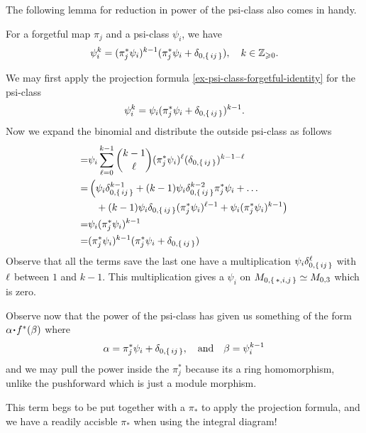 \documentclass[12pt]{memoir}
\begin{document}
The following lemma for reduction in power of the psi-class also comes in handy.

\begin{Lem}
For a forgetful map $\pi_j$ and a psi-class $\psi_i$, we have 
$$\psi_i^k=(\pi_j^\ast\psi_i)^{k-1}(\pi_j^\ast\psi_i+\delta_{0,\{\,ij\,\}}),\quad k\in\mathbb{Z}_{\geqslant 0}.$$
\end{Lem}

\begin{ptcbp}
    We may first apply the projection formula \ref{ex-psi-class-forgetful-identity} for the psi-class
    $$\psi_i^k=\psi_i(\pi_j^\ast\psi_i+\delta_{0,\{\,ij\,\}})^{k-1}.$$
    Now we expand the binomial and distribute the outside psi-class as follows 
    \begin{align*}
        =&\psi_i\sum_{\ell=0}^{k-1}\binom{k-1}{\ell}(\pi_j^\ast\psi_i)^\ell(\delta_{0,\{\,ij\,\}})^{k-1-\ell}\\
        =&\left(\psi_i\delta_{0,\{\,ij\,\}}^{k-1}+(k-1){\psi_i}\delta_{0,\{\,ij\,\}}^{k-2}\pi_j^\ast\psi_i+\dots\right.\\
        &\left.\phantom{\left(\right.}+(k-1)\psi_i\delta_{0,\{\,ij\,\}}(\pi_j^\ast\psi_i)^{\ell-1}+\psi_i(\pi_j^\ast\psi_i)^{k-1}\right)\\
        =&\psi_i(\pi_j^\ast\psi_i)^{k-1}\\
        =&(\pi_j^\ast\psi_i)^{k-1}(\pi_j^\ast\psi_i+\delta_{0,\{\,ij\,\}})
    \end{align*}
    Observe that all the terms save the last one have a multiplication $\psi_i\delta_{0,\{\,ij\,\}}^{\ell}$ with $\ell$ between $1$ and $k-1$. This multiplication gives a $\psi_i$ on $M_{0,\{\,\ast,i,j\,\}}\simeq M_{0,3}$ which is zero.  
\end{ptcbp}

Observe now that the power of the psi-class has given us something of the form $\al\.f^\ast(\bt)$ where 
$$\alpha=\pi_j^\ast\psi_i+\delta_{0,\{\,ij\,\}},\quad\text{and}\quad\beta=\psi_i^{k-1}$$
and we may pull the power inside the $\pi_j^\ast$ because its a ring homomorphism, unlike the pushforward which is just a module morphism.\par
This term begs to be put together with a $\pi_\ast$ to apply the projection formula, and we have a readily accisble $\pi_\ast$ when using the integral diagram!
\end{document}
